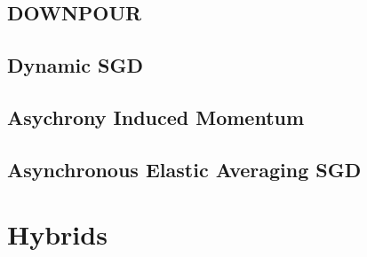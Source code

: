 \subsection{DOWNPOUR}
\label{sec:downpour}

\subsection{Dynamic SGD}
\label{sec:dyn_sgd}

\subsection{Asychrony Induced Momentum}
\label{sec:implicit_momentum}

\subsection{Asynchronous Elastic Averaging SGD}
\label{sec:aeasgd}

\section{Hybrids}
\label{sec:hybrids}

